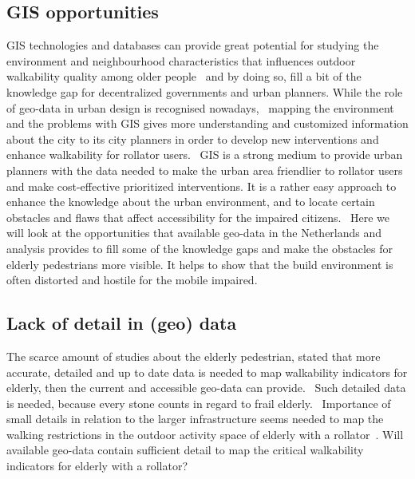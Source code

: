 \subsection{GIS opportunities}
GIS technologies and databases can provide great potential for studying the environment and neighbourhood characteristics that influences outdoor walkability quality among older people~\cite{Vine2012} and by doing so, fill a bit of the knowledge gap for decentralized governments and urban planners. While the role of geo-data in urban design is recognised nowadays,~\cite{Matthews2003} mapping the environment and the problems with GIS gives more understanding and customized information about the city to its city planners in order to develop new interventions and enhance walkability for rollator users.~\cite{Matthews2003, Svensson2010} GIS is a strong medium to provide urban planners with the data needed to make the urban area friendlier to rollator users and make cost-effective prioritized interventions. It is a rather easy approach to enhance the knowledge about the urban environment, and to locate certain obstacles and flaws that affect accessibility for the impaired citizens.~\cite{Svensson2010} Here we will look at the opportunities that available geo-data in the Netherlands and analysis provides to fill some of the knowledge gaps and make the obstacles for elderly pedestrians more visible. It helps to show that the build environment is often distorted and hostile for the mobile impaired.~\cite{Matthews2003}

\subsection{Lack of detail in (geo) data}
The scarce amount of studies about the elderly pedestrian, stated that more accurate, detailed and up to date data is needed to map walkability indicators for elderly, then the current and accessible geo-data can provide.~\cite{Verschuur2013, Laakso2011} Such detailed data is needed, because every stone counts in regard to frail elderly.~\cite{Matthews2003, Laakso2011} Importance of small details in relation to the larger infrastructure seems needed to map the walking restrictions in the outdoor activity space of elderly with a rollator~\cite{Stahl2008, Stahl2013}. Will available geo-data contain sufficient detail to map the critical walkability indicators for elderly with a rollator? 

